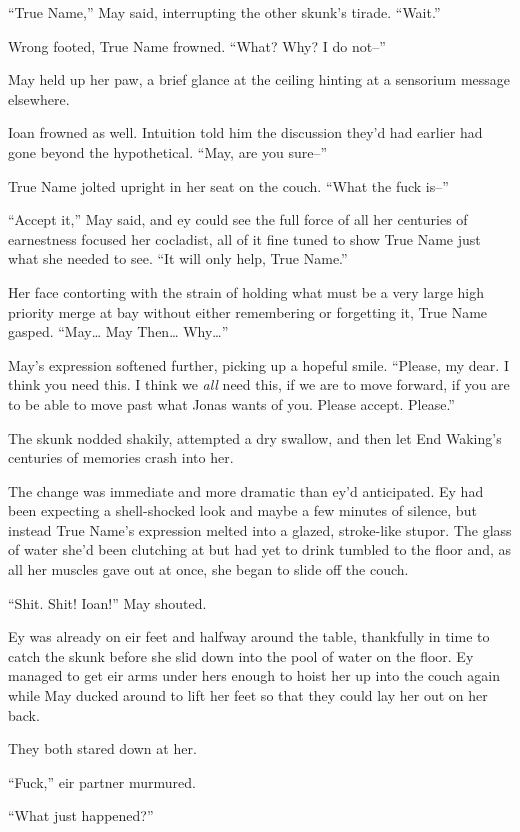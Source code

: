 ``True Name,'' May said, interrupting the other skunk's tirade. ``Wait.''

Wrong footed, True Name frowned. ``What? Why? I do not--''

May held up her paw, a brief glance at the ceiling hinting at a sensorium message elsewhere.

Ioan frowned as well. Intuition told him the discussion they'd had earlier had gone beyond the hypothetical. ``May, are you sure--''

True Name jolted upright in her seat on the couch. ``What the fuck is--''

``Accept it,'' May said, and ey could see the full force of all her centuries of earnestness focused her cocladist, all of it fine tuned to show True Name just what she needed to see. ``It will only help, True Name.''

Her face contorting with the strain of holding what must be a very large high priority merge at bay without either remembering or forgetting it, True Name gasped. ``May\ldots{} May Then\ldots{} Why\ldots{}''

May's expression softened further, picking up a hopeful smile. ``Please, my dear. I think you need this. I think we \emph{all} need this, if we are to move forward, if you are to be able to move past what Jonas wants of you. Please accept. Please.''

The skunk nodded shakily, attempted a dry swallow, and then let End Waking's centuries of memories crash into her.

The change was immediate and more dramatic than ey'd anticipated. Ey had been expecting a shell-shocked look and maybe a few minutes of silence, but instead True Name's expression melted into a glazed, stroke-like stupor. The glass of water she'd been clutching at but had yet to drink tumbled to the floor and, as all her muscles gave out at once, she began to slide off the couch.

``Shit. Shit! Ioan!'' May shouted.

Ey was already on eir feet and halfway around the table, thankfully in time to catch the skunk before she slid down into the pool of water on the floor. Ey managed to get eir arms under hers enough to hoist her up into the couch again while May ducked around to lift her feet so that they could lay her out on her back.

They both stared down at her.

``Fuck,'' eir partner murmured.

``What just happened?''


